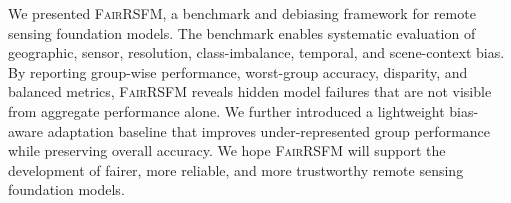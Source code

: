 \documentclass[10pt,twocolumn,letterpaper]{article}
\newcommand{\method}{\textsc{FairRSFM}\xspace}
\begin{document}
We presented \method, a benchmark and debiasing framework for remote sensing foundation models. The benchmark enables systematic evaluation of geographic, sensor, resolution, class-imbalance, temporal, and scene-context bias. By reporting group-wise performance, worst-group accuracy, disparity, and balanced metrics, \method reveals hidden model failures that are not visible from aggregate performance alone. We further introduced a lightweight bias-aware adaptation baseline that improves under-represented group performance while preserving overall accuracy. We hope \method will support the development of fairer, more reliable, and more trustworthy remote sensing foundation models.


{
    \small
    
    
}
\end{document}
